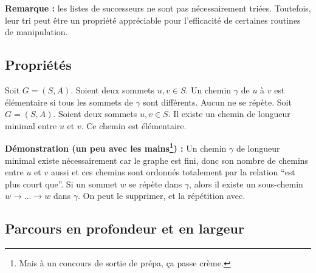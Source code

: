\documentclass[../../../main.tex]{subfiles}
\begin{document}
\textbf{Remarque :} les listes de successeurs ne sont pas nécessairement triées. Toutefois, leur tri peut être un propriété appréciable pour l'efficacité de certaines routines de manipulation.
\subsection{Propriétés}
 {
	Soit $G = (S, A)$. Soient deux sommets $u, v\in S$. Un chemin $\gamma$ de $u$ à $v$ est élémentaire si tous les sommets de $\gamma$ sont différents. Aucun ne se répète.
}
 Soit $G = (S, A)$. Soient deux sommets $u, v\in S$. Il existe un chemin de longueur minimal entre $u$ et $v$. Ce chemin est élémentaire.

\textbf{Démonstration (un peu avec les mains\footnote{Mais à un concours de sortie de prépa, ça passe crème.}) :} Un chemin $\gamma$ de longueur minimal existe nécessairement car le graphe est fini, donc son nombre de chemins entre $u$ et $v$ aussi et ces chemins sont ordonnés totalement par la relation ``est plus court que''. Si un sommet $w$ se répète dans $\gamma$, alors il existe un sous-chemin $w\rightarrow \dots \rightarrow w$ dans $\gamma$. On peut le supprimer, et la répétition avec.
\subsection{Parcours en profondeur et en largeur}
\end{document}
